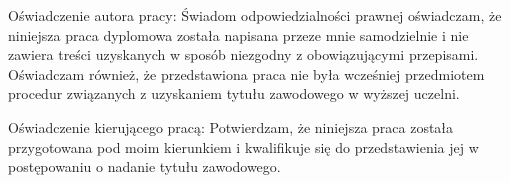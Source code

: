 
Oświadczenie autora pracy: \newline\newline\akapit
Świadom odpowiedzialności prawnej oświadczam, że niniejsza praca dyplomowa została napisana przeze mnie samodzielnie i nie zawiera treści uzyskanych w sposób niezgodny z obowiązującymi przepisami.
Oświadczam również, że przedstawiona praca nie była wcześniej przedmiotem procedur związanych z uzyskaniem tytułu zawodowego w wyższej uczelni.
\vspace{2cm}

\begingroup
  \centering
  \hspace{1cm}
  \par
\endgroup

Oświadczenie kierującego pracą: \newline\newline\akapit
Potwierdzam, że niniejsza praca została przygotowana pod moim kierunkiem i kwalifikuje się do przedstawienia jej w postępowaniu o nadanie tytułu zawodowego.
\vspace{2cm}


\begingroup
  \centering
  \hspace{1cm}
  \par
\endgroup


